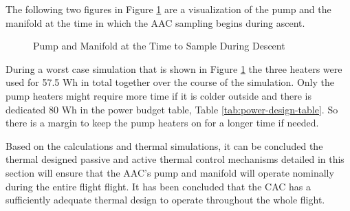 The following two figures in Figure \ref{fig:Pump-Valve-ascent-sample-4-6} are a visualization of the pump and the manifold at the time in which the AAC sampling begins during ascent. 
\begin{figure}[H]
    \centering
    \hifll
    \caption{Pump and Manifold at the Time to Sample During Descent}
    \label{fig:Pump-Valve-ascent-sample-4-6}
\end{figure}

During a worst case simulation that is shown in Figure \ref{fig:Pump-Valve-ascent-sample-4-6} the three heaters were used for 57.5 Wh in total together over the course of the simulation. Only the pump heaters might require more time if it is colder outside and there is dedicated 80 Wh in the power budget table, Table \ref{tab:power-design-table}. So there is a margin to keep the pump heaters on for a longer time if needed.

Based on the calculations and thermal simulations, it can be concluded the thermal designed passive and active thermal control mechanisms detailed in this section will ensure that the AAC's pump and manifold will operate nominally during the entire flight flight. It has been concluded that the CAC has a sufficiently adequate thermal design to operate throughout the whole flight.